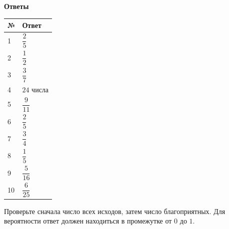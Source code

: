 \documentclass[a4paper,12pt]{article}
\begin{document}
{\Large\bfseries\color{darkaccent}Ответы}\par
\vspace{7mm}
\begin{center}
\begin{tabular}{@{}p{.16\linewidth}p{.66\linewidth}@{}}
\toprule
№ & Ответ\\
\midrule
1 & $\dfrac25$\\
2 & $\dfrac12$\\
3 & $\dfrac37$\\
4 & $24$ числа\\
5 & $\dfrac9{11}$\\
6 & $\dfrac25$\\
7 & $\dfrac34$\\
8 & $\dfrac15$\\
9 & $\dfrac5{16}$\\
10 & $\dfrac6{25}$\\
\bottomrule
\end{tabular}
\end{center}
\vspace{10mm}
\textcolor{quiet}{Проверьте сначала число всех исходов, затем число благоприятных. Для вероятности ответ должен находиться в промежутке от $0$ до $1$.}
\end{document}
